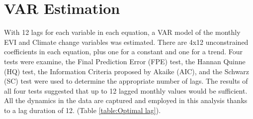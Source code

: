 \section{VAR Estimation} With 12 lags for each variable in each equation, a VAR model of the monthly EVI and Climate change variables was estimated. There are 4x12 unconstrained coefficients in each equation, plus one for a constant and one for a trend. Four tests were examine, the Final Prediction Error (FPE) test, the Hannan Quinne (HQ) test, the Information Criteria proposed by Akaike (AIC), and the Schwarz (SC) test were used to determine the appropriate number of lags. The results of all four tests suggested that up to 12 lagged monthly values would be sufficient. All the dynamics in the data are captured and employed in this analysis thanks to a lag duration of 12. (Table \ref{table:Optimal lag}).

